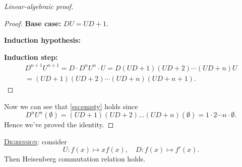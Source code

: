 \documentclass{report}
\newcommand{\fancyem}[1]{\underline{\textsc{#1}}}
\theoremstyle{definition}
\theoremstyle{remark}
\numberwithin{equation}{section}
\begin{document}
\begin{proof}[Linear-algebraic proof]
\begin{proof}
        \textbf{Base case:} $DU = UD + 1$.
        
        \textbf{Induction hypothesis:}

        \textbf{Induction step:} \begin{multline*}
            D^{n+1}U^{n+1} = D \cdot D^nU^n \cdot U = D(UD + 1)(UD + 2)\cdots(UD + n)U \\
            = (UD + 1)(UD + 2)\cdots(UD + n)(UD + n + 1).
        \end{multline*}
    \end{proof}
    Now we can see that \eqref{eq:empty} holds since \[
        D^nU^n(\emptyset) = (UD + 1)(UD + 2)\ldots(UD + n)(\emptyset) = 1 \cdot 2 \cdots n \cdot \emptyset.
    \] Hence we've proved the identity.
\end{proof}

\fancyem{Digression}: consider \[
    U: f(x) \mapsto xf(x), \quad D: f(x) \mapsto f'(x).  
\] Then Heisenberg commutation relation holds.
\end{document}
